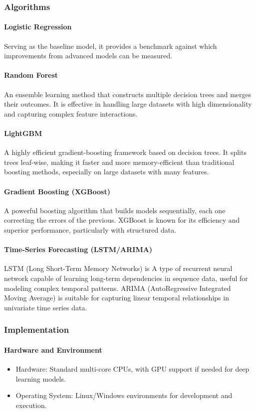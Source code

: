 \documentclass[conference]{IEEEtran}
\begin{document}
\subsubsection{Algorithms}
\paragraph{Logistic Regression}
 Serving as the baseline model, it provides a benchmark against which improvements from advanced models can be measured.
\paragraph{Random Forest}
An ensemble learning method that constructs multiple decision trees and merges their outcomes. It is effective in handling large datasets with high dimensionality and capturing complex feature interactions.
\paragraph{LightGBM}
A highly efficient gradient-boosting framework based on decision trees. It splits trees leaf-wise, making it faster and more memory-efficient than traditional boosting methods, especially on large datasets with many features.
\paragraph{Gradient Boosting (XGBoost)}
A powerful boosting algorithm that builds models sequentially, each one correcting the errors of the previous. XGBoost is known for its efficiency and superior performance, particularly with structured data.
\paragraph{Time-Series Forecasting (LSTM/ARIMA)}
LSTM (Long Short-Term Memory Networks) is A type of recurrent neural network capable of learning long-term dependencies in sequence data, useful for modeling complex temporal patterns. ARIMA (AutoRegressive Integrated Moving Average) is suitable for capturing linear temporal relationships in univariate time series data.

\subsubsection{Implementation}
\paragraph{Hardware and Environment}
\begin{itemize}
    \item Hardware: Standard multi-core CPUs, with GPU support if needed for deep learning models.
    \item Operating System: Linux/Windows environments for development and execution.
\end{itemize}
\end{document}
